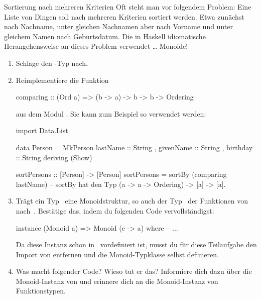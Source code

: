\documentclass{uebblatt}
\begin{document}
\begin{aufgabe}{Sortierung nach mehreren Kriterien}
Oft steht man vor folgendem Problem: Eine Liste von Dingen soll nach mehreren
Kriterien sortiert werden. Etwa zunächst nach Nachname, unter gleichen
Nachnamen aber nach Vorname und unter gleichem Namen nach Geburtsdatum. Die
in Haskell idiomatische Herangehensweise an dieses Problem verwendet \ldots{}
Monoide!

\begin{enumerate}
\item Schlage den -Typ nach.
\item Reimplementiere die Funktion
\begin{haskellcode}
comparing :: (Ord a) => (b -> a) -> b -> b -> Ordering
\end{haskellcode}
aus dem Modul . Sie kann zum Beispiel so verwendet werden:
\begin{haskellcode}
import Data.List

data Person = MkPerson
    { lastName  :: String
    , givenName :: String
    , birthday  :: String
    }
    deriving (Show)

sortPersons :: [Person] -> [Person]
sortPersons = sortBy (comparing lastName)
-- sortBy hat den Typ (a -> a -> Ordering) -> [a] -> [a].
\end{haskellcode}
\item Trägt ein Typ~ eine Monoidstruktur, so auch der
Typ~ der Funktionen von~
nach~. Bestätige das, indem du folgenden Code vervollständigst:
\begin{haskellcode}
instance (Monoid a) => Monoid (e -> a) where
    -- ...
\end{haskellcode}
Da diese Instanz schon in~ vordefiniert ist, musst
du für diese Teilaufgabe den Import von entfernen
und die Monoid-Typklasse selbst definieren.
\item Was macht folgender Code? Wieso tut er das? Informiere dich dazu über
die Monoid-Instanz von  und erinnere dich an die
Monoid-Instanz von Funktionstypen.
\end{enumerate}
\end{aufgabe}
\end{document}
